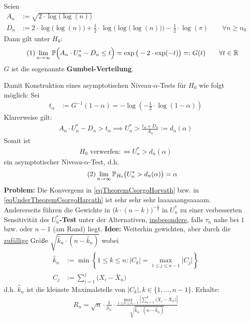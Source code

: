 \begin{thm}\label{theoremCH} %
	Seien
	\begin{align*}
		A_n&:=\sqrt{2\cdot\log\big(\log(n)\big)}\\
		D_n&:=2\cdot\log\big(\log(n)\big)+\frac{1}{2}\cdot\log\Big(\log\big(\log(n)\big)\Big)-\frac{1}{2}\cdot\log(\pi)\qquad\forall n\geq n_0
	\end{align*}
	Dann gilt unter $H_0$:
	\begin{align}\label{eqTheoremCsorgoHorvath}\tag{1}
		\lim\limits_{n\to\infty}\mathbb{P}\Big(A_n\cdot U_n^\ast-D_n\leq t\Big)=\exp\big(-2\cdot\exp(-t)\big)=:G(t)
		\qquad\forall t\in\mathbb{R}
	\end{align}
	$G$ ist die sogenannte \textbf{Gumbel-Verteilung}.
\end{thm}

Damit Konstruktion eines asymptotischen Niveau-$\alpha$-Tests für $H_0$ wie folgt möglich: Sei
\begin{align*}
	t_\alpha&:=G^{-1}(1-\alpha)=-\log\left(-\frac{1}{2}\cdot\log(1-\alpha)\right)
\end{align*}
Klarerweise gilt:
\begin{align*}
	A_n\cdot U_n^\ast-D_n>t_\alpha\implies U_n^\ast>\frac{t_\alpha+D_n}{A_n}:=d_n(\alpha)
\end{align*}
Somit ist 
\begin{align*}
	H_0\text{ verwerfen}:\Longleftrightarrow U_n^\ast>d_n(\alpha)
\end{align*}
ein asymptotischer Niveau-$\alpha$-Test, d.h.
\begin{align}\label{eqUnderTheoremCsorgoHarcath}\tag{2}
	\lim\limits_{n\to\infty}\mathbb{P}_{H_0}\big(U_n^\ast>d_n(\alpha)\big)=\alpha
\end{align}
\textbf{Problem:} Die Konvergenz in \eqref{eqTheoremCsorgoHorvath} bzw. in \eqref{eqUnderTheoremCsorgoHarcath} ist sehr sehr sehr laaaaaangsaaaam. %
Andererseits führen die Gewichte in $\big(k\cdot(n-k)\big)^{-\frac{1}{2}}$ in $U_n^\ast$ zu einer verbesserten Sensitivität des \textbf{$U_n^\ast$-Test} unter der Alternativen, \underline{insbesondere}, falls $\tau_n$ nahe bei $1$ bzw. oder $n-1$ (am Rand) liegt.\nl
\textbf{Idee:} Weiterhin gewichten, aber durch die \ul{zufällige} Größe $\sqrt{\hat{k}_n\cdot(n-\hat{k}_n)}$ wobei 
\begin{align*}
	\hat{k}_n&:=\min\left\lbrace 1\leq k\leq n:\big|C_k\big|=\max\limits_{1\leq j\leq n-1}\big|C_j\big|\right\rbrace\\
	C_j&:=\sum\limits_{i=1}^j \big(X_i-\overline{X}_n\big)
\end{align*}
d.h. $\hat{k}_n$ ist die kleinste Maximalstelle von $|C_k|,k\in\lbrace1,\ldots,n-1\rbrace$. Erhalte:
\begin{align*}
	R_n=\sqrt{n}\cdot\frac{1}{\hat{\sigma}_n}\cdot\frac{\max\limits_{1\leq k\leq n-1}\left|\sum\limits_{i=1}^k(X_i-\overline{X}_n\big)\right|}{\sqrt{\hat{k}_n\cdot(n-\hat{k}_n)}}
\end{align*}

